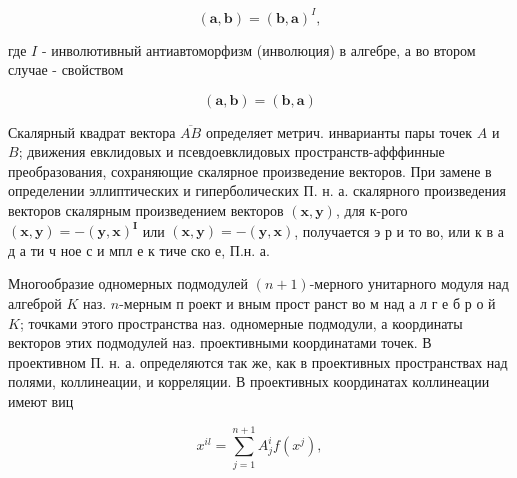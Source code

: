 \documentclass[10pt]{article}
\begin{document}
\[

(\boldsymbol{a}, \boldsymbol{b})=(\boldsymbol{b}, \boldsymbol{a})^{I},

\]



где $I$ - инволютивный антиавтоморфизм (инволюция) в алгебре, а во втором случае - свойством



\[

(\boldsymbol{a}, \boldsymbol{b})=(\boldsymbol{b}, \boldsymbol{a})

\]



Скалярный квадрат вектора $\overline{A B}$ определяет метрич. инварианты пары точек $A$ и $B$; движения евклидовых и псевдоевклидовых пространств-афффинные преобразования, сохраняющие скалярное произведение векторов. При замене в определении эллиптических и гиперболических П. н. а. скалярного произведения векторов скалярным произведением векторов $(\boldsymbol{x}, \boldsymbol{y})$, для к-рого $(\boldsymbol{x}, \boldsymbol{y})=-(\boldsymbol{y}, \boldsymbol{x})^{\boldsymbol{I}}$ или $(\boldsymbol{x}, \boldsymbol{y})=-(\boldsymbol{y}, \boldsymbol{x})$, получается э р и то во, или к в а д а ти ч ное с и мпл е к тиче ско е, П.н. а.



Многообразие одномерных подмодулей $(n+1)$-мерного унитарного модуля над алгеброй $K$ наз. $n$-мерным п роект и вным прост ранст во м над а л г е б р о й $K$; точками этого пространства наз. одномерные подмодули, а координаты векторов этих подмодулей наз. проективными координатами точек. В проективном П. н. а. определяются так же, как в проективных пространствах над полями, коллинеации, и корреляции. В проективных координатах коллинеации имеют виц



\[

x^{i l}=\sum_{j=1}^{n+1} A_{j}^{i} f\left(x^{j}\right),

\]
\end{document}
